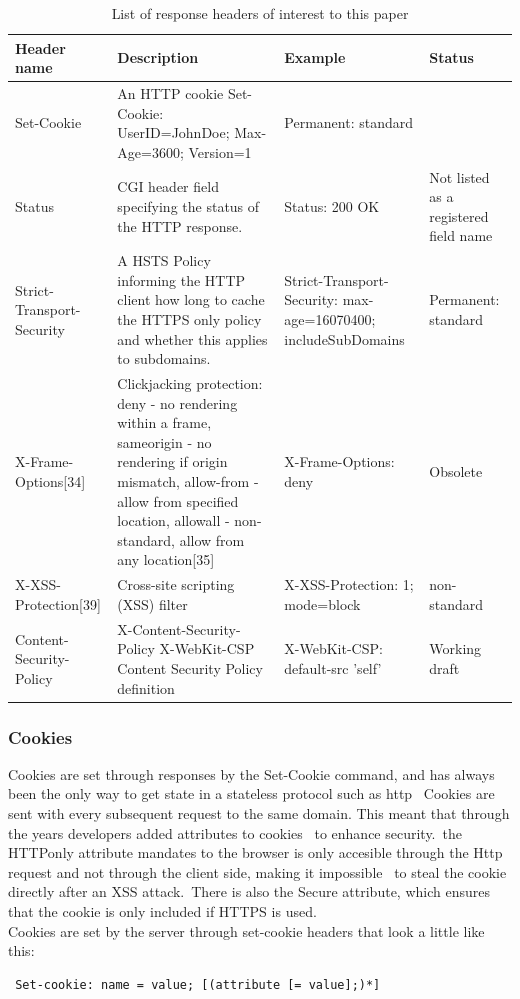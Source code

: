 \begin{table}[H]
\centering
\begin{tabular}{p{2cm}|p{6cm}|p{4cm}|p{2cm}}
Header name & Description & Example & Status \\\hline
Set-Cookie &	An HTTP cookie 	Set-Cookie: UserID=JohnDoe; Max-Age=3600; Version=1 &Permanent: standard\\
Status &CGI header field specifying the status of the HTTP response. &	Status: 200 OK 	& Not listed as a registered field name\\
Strict-Transport-Security & A HSTS Policy informing the HTTP client how long to cache the HTTPS only policy and whether this applies to subdomains. &Strict-Transport-Security: max-age=16070400; includeSubDomains &Permanent: standard\\
X-Frame-Options[34] &Clickjacking protection: deny - no rendering within a frame, sameorigin - no rendering if origin mismatch, allow-from - allow from specified location, allowall - non-standard, allow from any location[35] &X-Frame-Options: deny &Obsolete\\
X-XSS-Protection[39] &Cross-site scripting (XSS) filter &X-XSS-Protection: 1; mode=block& non-standard \\
Content-Security-Policy &X-Content-Security-Policy X-WebKit-CSP Content Security Policy definition& X-WebKit-CSP: default-src 'self' & Working draft
\end{tabular}
\caption{\label{tab:resp}List of response headers of interest to this paper}
\end{table}

\subsubsection{Cookies}
\label{cookie}
Cookies are set through responses by the Set-Cookie command, and has always been the only way to get state in a stateless protocol such as http \
Cookies are sent with every subsequent request to the same domain. This meant that through the years developers added attributes to cookies \
to enhance security.\
the HTTPonly attribute mandates to the browser is only accesible through the Http request and not through the client side, making it impossible \
to steal the cookie directly after an XSS attack.\
There is also the Secure attribute, which ensures that the cookie is only included if HTTPS is used.\\

Cookies are set by the server through set-cookie headers that look a little like this: \
\begin{verbatim}
 Set-cookie: name = value; [(attribute [= value];)*]
\end{verbatim}

